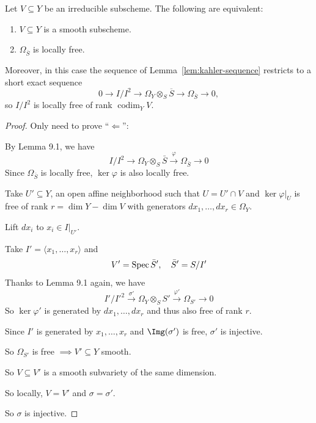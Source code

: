 \begin{proposition}[Prop.~9.2]
    Let $V\subseteq Y$ be an irreducible subscheme.  The following are equivalent:
    \begin{enumerate}
        \item $V\subseteq Y$ is a smooth subscheme.
        \item $\Omega_{\overline S}$ is locally free.
    \end{enumerate}
    Moreover, in this case the sequence of Lemma~\ref{lem:kahler-sequence}
    restricts to a short exact sequence
    \[
        0\longrightarrow I/I^2
        \longrightarrow \Omega_Y\otimes_S \overline S
        \longrightarrow \Omega_{\overline S}
        \longrightarrow 0,
    \]
    so $I/I^2$ is locally free of rank $\operatorname{codim}_Y V$.
\end{proposition}

\begin{proof}
    Only need to prove ``$\Leftarrow$'':

    \noindent By Lemma 9.1, we have
    \[
        I/I^2 \to \Omega_Y \otimes_S \bar{S} \xrightarrow{\varphi} \Omega_{\bar{S}} \to 0
    \]
    Since $\Omega_{\bar{S}}$ is locally free, $\ker \varphi$ is also locally free.

    \noindent Take $U' \subseteq Y$, an open affine neighborhood such that $U = U' \cap V$ and $\ker \varphi|_U$ is free of rank $r = \dim Y - \dim V$ with generators $dx_1, \dots, dx_r \in \Omega_Y$.

    \noindent Lift $dx_i$ to $x_i \in I|_{U'}$.

    \noindent Take $I' = \langle x_1, \dots, x_r \rangle$ and
    \[
        V' = \operatorname{Spec} \bar{S}', \quad \bar{S}' = S/I'
    \]
    Thanks to Lemma 9.1 again, we have
    \[
        I'/{I'}^2 \xrightarrow{\sigma'} \Omega_Y \otimes_S S' \xrightarrow{\varphi'} \Omega_{S'} \to 0
    \]
    So $\ker \varphi'$ is generated by $dx_1, \dots, dx_r$ and thus also free of rank $r$.

    \noindent Since $I'$ is generated by $x_1, \dots, x_r$ and $\Img(\sigma')$ is free, $\sigma'$ is injective.

    \noindent So $\Omega_{S'}$ is free $\implies V' \subseteq Y$ smooth.

    \noindent So $V \subseteq V'$ is a smooth subvariety of the same dimension.

    \noindent So locally, $V = V'$ and $\sigma = \sigma'$.

    \noindent So $\sigma$ is injective.
\end{proof}

